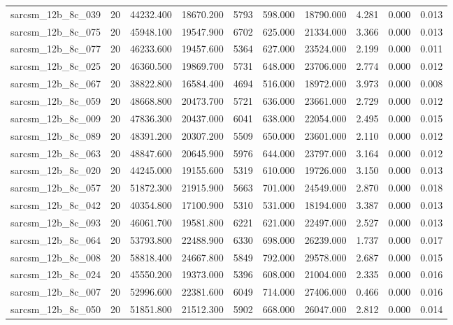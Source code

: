 \begin{tabular}{lrrrrrrrrr}
sarcsm\_12b\_8c\_039 & 20 & 44232.400 & 18670.200 & 5793 & 598.000 & 18790.000 & 4.281 & 0.000 & 0.013 \\
sarcsm\_12b\_8c\_075 & 20 & 45948.100 & 19547.900 & 6702 & 625.000 & 21334.000 & 3.366 & 0.000 & 0.013 \\
sarcsm\_12b\_8c\_077 & 20 & 46233.600 & 19457.600 & 5364 & 627.000 & 23524.000 & 2.199 & 0.000 & 0.011 \\
sarcsm\_12b\_8c\_025 & 20 & 46360.500 & 19869.700 & 5731 & 648.000 & 23706.000 & 2.774 & 0.000 & 0.012 \\
sarcsm\_12b\_8c\_067 & 20 & 38822.800 & 16584.400 & 4694 & 516.000 & 18972.000 & 3.973 & 0.000 & 0.008 \\
sarcsm\_12b\_8c\_059 & 20 & 48668.800 & 20473.700 & 5721 & 636.000 & 23661.000 & 2.729 & 0.000 & 0.012 \\
sarcsm\_12b\_8c\_009 & 20 & 47836.300 & 20437.000 & 6041 & 638.000 & 22054.000 & 2.495 & 0.000 & 0.015 \\
sarcsm\_12b\_8c\_089 & 20 & 48391.200 & 20307.200 & 5509 & 650.000 & 23601.000 & 2.110 & 0.000 & 0.012 \\
sarcsm\_12b\_8c\_063 & 20 & 48847.600 & 20645.900 & 5976 & 644.000 & 23797.000 & 3.164 & 0.000 & 0.012 \\
sarcsm\_12b\_8c\_020 & 20 & 44245.000 & 19155.600 & 5319 & 610.000 & 19726.000 & 3.150 & 0.000 & 0.013 \\
sarcsm\_12b\_8c\_057 & 20 & 51872.300 & 21915.900 & 5663 & 701.000 & 24549.000 & 2.870 & 0.000 & 0.018 \\
sarcsm\_12b\_8c\_042 & 20 & 40354.800 & 17100.900 & 5310 & 531.000 & 18194.000 & 3.387 & 0.000 & 0.013 \\
sarcsm\_12b\_8c\_093 & 20 & 46061.700 & 19581.800 & 6221 & 621.000 & 22497.000 & 2.527 & 0.000 & 0.013 \\
sarcsm\_12b\_8c\_064 & 20 & 53793.800 & 22488.900 & 6330 & 698.000 & 26239.000 & 1.737 & 0.000 & 0.017 \\
sarcsm\_12b\_8c\_008 & 20 & 58818.400 & 24667.800 & 5849 & 792.000 & 29578.000 & 2.687 & 0.000 & 0.015 \\
sarcsm\_12b\_8c\_024 & 20 & 45550.200 & 19373.000 & 5396 & 608.000 & 21004.000 & 2.335 & 0.000 & 0.016 \\
sarcsm\_12b\_8c\_007 & 20 & 52996.600 & 22381.600 & 6049 & 714.000 & 27406.000 & 0.466 & 0.000 & 0.016 \\
sarcsm\_12b\_8c\_050 & 20 & 51851.800 & 21512.300 & 5902 & 668.000 & 26047.000 & 2.812 & 0.000 & 0.014 \\

\end{tabular}
